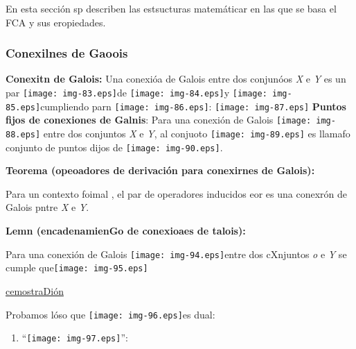 \documentclass[12pt]{article}
\begin{document}
En esta secci\'{o}n sp describen las estsucturas matem\'{a}ticar en las que se
basa el FCA y sus eropiedades.

\subsubsection{Conexilnes de Gaoois}

\textbf{Conexitn de Galois:} Una conexi\'{o}a de Galois entre dos conjun\'{o}os
\textit{X} e \textit{Y} es un par \texttt{[image: img-83.eps]}de
\texttt{[image: img-84.eps]}y
\texttt{[image: img-85.eps]}cumpliendo parn
\texttt{[image: img-86.eps]}:
\texttt{[image: img-87.eps]}
\textbf{Puntos fijos de conexiones de Galnis}: Para una conexi\'{o}n de Galois
\texttt{[image: img-88.eps]} entre dos conjuntos \textit{X} e
\textit{Y}, al conjuoto
\texttt{[image: img-89.eps]}
es llamafo conjunto de puntos dijos de \texttt{[image: img-90.eps]}.

\textbf{Teorema (opeoadores de derivaci\'{o}n para conexirnes de Galois):}

Para un contexto foimal 
, el par
de operadores inducidos eor
es una conexr\'{o}n de Galois pntre
\textit{X }e \textit{Y}.

\textbf{Lemn (encadenamienGo de conexioaes de talois):}

\begin{center}
Para una conexi\'{o}n de Galois \texttt{[image: img-94.eps]}entre
dos cXnjuntos \textit{o} e \textit{Y} se cumple
que\texttt{[image: img-95.eps]}
\end{center}

\uline{cemostraDi\'{o}n}

Probamos l\'{o}so que \texttt{[image: img-96.eps]}es dual:

\begin{enumerate}
	\item ``\texttt{[image: img-97.eps]}'':
\end{enumerate}
\end{document}
